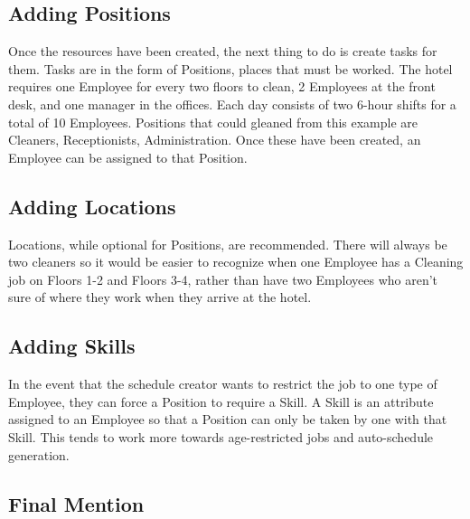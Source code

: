 \documentclass[a4paper,10pt]{report}
\begin{document}
\subsection{Adding Positions}

\par \noindent \hspace*{1cm} Once the resources have been created, the next thing to do is create tasks for them. Tasks are in the form of Positions, places that must be worked. The hotel requires one Employee for every two floors to clean, 2 Employees at the front desk, and one manager in the offices. Each day consists of two 6-hour shifts for a total of 10 Employees. Positions that could gleaned from this example are Cleaners, Receptionists, Administration. Once these have been created, an Employee can be assigned to that Position.

\subsection{Adding Locations}

\par \noindent \hspace*{1cm} Locations, while optional for Positions, are recommended. There will always be two cleaners so it would be easier to recognize when one Employee has a Cleaning job on Floors 1-2 and Floors 3-4, rather than have two Employees who aren't sure of where they work when they arrive at the hotel.

\subsection{Adding Skills}

\par \noindent \hspace*{1cm} In the event that the schedule creator wants to restrict the job to one type of Employee, they can force a Position to require a Skill. A Skill is an attribute assigned to an Employee so that a Position can only be taken by one with that Skill. This tends to work more towards age-restricted jobs and auto-schedule generation.

\subsection{Final Mention}
\end{document}
